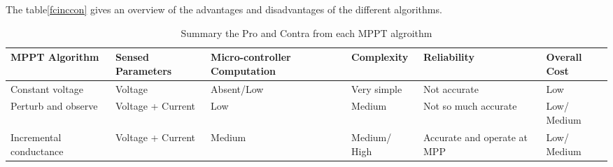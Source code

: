 The table\ref{fcinccon} gives an overview of the advantages and disadvantages of the different algorithms.
\begin{table}[H]
	\centering 
	\begin{tabular}{|>{\centering}m{2cm}|>{\centering}m{2cm}|>{\centering}m{2cm}|>{\centering}m{2cm}|>{\centering}m{2cm}|>{\centering}m{2cm}|}
		\hline
		\rowcolor{lightgray}						 \textbf{MPPT Algorithm} & 	
		\textbf{Sensed Parameters} &
		\textbf{Micro-controller Computation} &
		\textbf{Complexity}&
		\textbf{Reliability}	&
		\textbf{Overall Cost}
		\tabularnewline  \hline
		Constant voltage 	& Voltage 		& Absent/Low &  Very simple & Not accurate & Low 										\tabularnewline \hline
		Perturb and observe & Voltage + Current  & Low  &  Medium & Not so much accurate & Low/ Medium 		\tabularnewline \hline
		Incremental conductance & Voltage + Current & Medium &  Medium/ High & Accurate and operate at MPP & Low/ Medium	\tabularnewline	\hline
	\end{tabular}
	\caption{Summary the Pro and Contra from each MPPT algroithm \cite{flowchartVC} }
	\label{tab:summaryMPPT}
\end{table}



